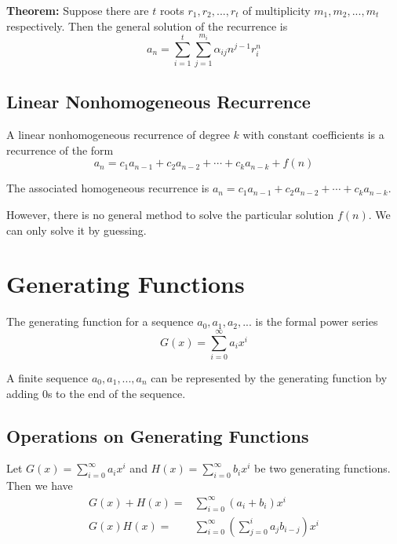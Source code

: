 \documentclass[a4paper,12pt]{article}
\begin{document}
\textbf{Theorem:}
Suppose there are $t$ roots $r_1, r_2, ..., r_t$ of multiplicity $m_1, m_2, ..., m_t$ respectively.
Then the general solution of the recurrence is
\begin{equation*}
	a_n = \sum_{i=1}^{t} \sum_{j=1}^{m_i} \alpha_{ij} n^{j-1} r_i^n
\end{equation*}

\subsection{Linear Nonhomogeneous Recurrence}

A linear nonhomogeneous recurrence of degree $k$ with constant coefficients is a recurrence of the form
\begin{equation*}
	a_n = c_1 a_{n-1} + c_2 a_{n-2} + \cdots + c_k a_{n-k} + f(n)
\end{equation*}

The associated homogeneous recurrence is $a_n = c_1 a_{n-1} + c_2 a_{n-2} + \cdots + c_k a_{n-k}$.

However, there is no general method to solve the particular solution $f(n)$.
We can only solve it by guessing.

\section{Generating Functions}

The generating function for a sequence $a_0, a_1, a_2, ...$ is the formal power series
\begin{equation*}
	G(x) = \sum_{i=0}^{\infty} a_i x^i
\end{equation*}

A finite sequence $a_0, a_1, ..., a_n$ can be represented by the generating function by adding 0s to the end of the sequence.

\subsection{Operations on Generating Functions}

Let $G(x) = \sum_{i=0}^{\infty} a_i x^i$ and $H(x) = \sum_{i=0}^{\infty} b_i x^i$ be two generating functions.
Then we have
\begin{align*}
	G(x) + H(x) =& \sum_{i=0}^{\infty} (a_i + b_i) x^i \\
	G(x) H(x) =& \sum_{i=0}^{\infty} \left( \sum_{j=0}^{i} a_j b_{i-j} \right) x^i
\end{align*}
\end{document}

